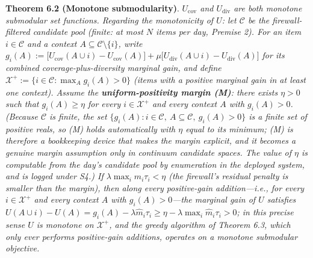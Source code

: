 \documentclass[
  11pt]{article}
\begin{document}
\textbf{Theorem 6.2 (Monotone submodularity)}.
\emph{\(U_{\mathrm{cov}}\) and \(U_{\mathrm{div}}\) are both monotone
submodular set functions. Regarding the monotonicity of \(U\): let
\(\mathcal{C}\) be the firewall-filtered candidate pool (finite: at most
\(N\) items per day, Premise 2). For an item \(i \in \mathcal{C}\) and a
context \(A \subseteq \mathcal{C} \setminus \{i\}\), write
\(g_i(A) := \big[U_{\mathrm{cov}}(A \cup i) - U_{\mathrm{cov}}(A)\big] + \mu\big[U_{\mathrm{div}}(A \cup i) - U_{\mathrm{div}}(A)\big]\)
for its combined coverage-plus-diversity marginal gain, and define
\(\mathcal{X}^+ := \{i \in \mathcal{C} : \max_{A} g_i(A) > 0\}\) (items
with a positive marginal gain in at least one context). Assume the
\textbf{uniform-positivity margin (M)}: there exists \(\eta > 0\) such
that \(g_i(A) \ge \eta\) for every \(i \in \mathcal{X}^+\) and every
context \(A\) with \(g_i(A) > 0\). (Because \(\mathcal{C}\) is finite,
the set
\(\{g_i(A) : i \in \mathcal{C},\ A \subseteq \mathcal{C},\ g_i(A) > 0\}\)
is a finite set of positive reals, so (M) holds automatically with
\(\eta\) equal to its minimum; (M) is therefore a bookkeeping device
that makes the margin explicit, and it becomes a genuine margin
assumption only in continuum candidate spaces. The value of \(\eta\) is
computable from the day's candidate pool by enumeration in the deployed
system, and is logged under S4.) If
\(\lambda \max_i \hat m_i \tau_i < \eta\) (the firewall's residual
penalty is smaller than the margin), then along every positive-gain
addition---i.e., for every \(i \in \mathcal{X}^+\) and every context
\(A\) with \(g_i(A) > 0\)---the marginal gain of \(U\) satisfies
\(U(A \cup i) - U(A) = g_i(A) - \lambda \hat m_i \tau_i \ge \eta - \lambda \max_i \hat m_i \tau_i > 0\);
in this precise sense \(U\) is monotone on \(\mathcal{X}^+\), and the
greedy algorithm of Theorem 6.3, which only ever performs positive-gain
additions, operates on a monotone submodular objective.}
\end{document}
